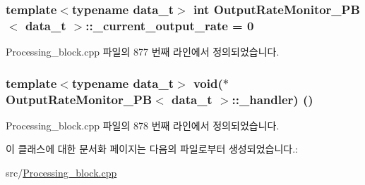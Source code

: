 \subsubsection[{\texorpdfstring{\+\_\+current\+\_\+output\+\_\+rate}{_current_output_rate}}]{\setlength{\rightskip}{0pt plus 5cm}template$<$typename data\+\_\+t$>$ int {\bf Output\+Rate\+Monitor\+\_\+\+PB}$<$ data\+\_\+t $>$\+::\+\_\+current\+\_\+output\+\_\+rate = 0\hspace{0.3cm}{\ttfamily [private]}}\hypertarget{classOutputRateMonitor__PB_a283856993acbc90229b59b6fad95c6b8}{}\label{classOutputRateMonitor__PB_a283856993acbc90229b59b6fad95c6b8}


Processing\+\_\+block.\+cpp 파일의 877 번째 라인에서 정의되었습니다.

\subsubsection[{\texorpdfstring{\+\_\+handler}{_handler}}]{\setlength{\rightskip}{0pt plus 5cm}template$<$typename data\+\_\+t$>$ void($\ast$ {\bf Output\+Rate\+Monitor\+\_\+\+PB}$<$ data\+\_\+t $>$\+::\+\_\+handler) ()\hspace{0.3cm}{\ttfamily [private]}}\hypertarget{classOutputRateMonitor__PB_ac685f0ea378935bea1e01d86fecfc6e4}{}\label{classOutputRateMonitor__PB_ac685f0ea378935bea1e01d86fecfc6e4}


Processing\+\_\+block.\+cpp 파일의 878 번째 라인에서 정의되었습니다.



이 클래스에 대한 문서화 페이지는 다음의 파일로부터 생성되었습니다.\+:\begin{DoxyCompactItemize}
\item 
src/\hyperlink{Processing__block_8cpp}{Processing\+\_\+block.\+cpp}\end{DoxyCompactItemize}
